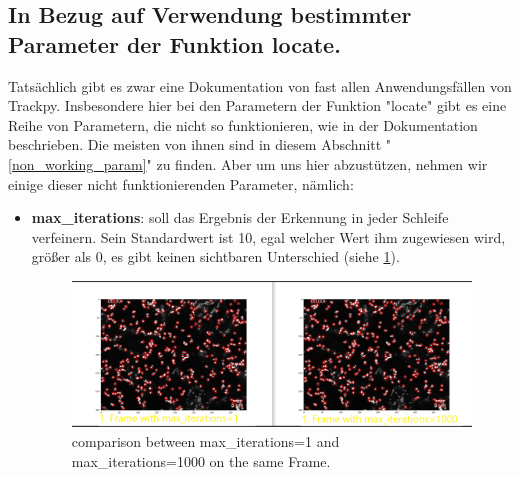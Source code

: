 \newpage

\subsection{In Bezug auf Verwendung bestimmter Parameter der Funktion locate. \label{kap2.2.d_verwendung_locate_param}}
Tatsächlich gibt es zwar eine Dokumentation von fast allen Anwendungsfällen von Trackpy. Insbesondere hier bei den Parametern der Funktion "locate" gibt es eine Reihe von Parametern, die nicht so funktionieren, wie in der Dokumentation beschrieben. 
Die meisten von ihnen sind in diesem Abschnitt "\ref{non_working_param}" zu finden. 
Aber um uns hier abzustützen, nehmen wir einige dieser nicht funktionierenden Parameter, nämlich:

\begin{itemize} 
	\item \textbf{max\_iterations}: soll das Ergebnis der Erkennung in jeder Schleife verfeinern. Sein Standardwert ist 10, egal welcher Wert ihm zugewiesen wird, größer als 0, es gibt keinen sichtbaren Unterschied (siehe \ref{fig:comparison max-iterations}). 
	\begin{figure}[H]
    \centering
    \includegraphics[scale=0.35]{Grafiken/trackpyBilder/comparison max_iterations.png}
    \caption{comparison between max\_iterations=1 and max\_iterations=1000 on the same Frame.}
    \label{fig:comparison max-iterations}
\end{figure} 
	
\end{itemize}
